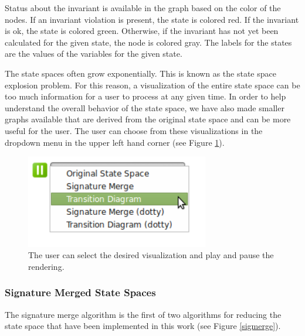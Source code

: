 Status about the invariant is available in the graph based on the color of the nodes. If an invariant violation is present, the state is colored red. If the invariant is ok, the state is colored green. Otherwise, if the invariant has not yet been calculated for the given state, the node is colored gray. The labels for the states are the values of the variables for the given state.

The state spaces often grow exponentially. This is known as the state space explosion problem. For this reason, a visualization of the entire state space can be too much information for a user to process at any given time. In order to help understand the overall behavior of the state space, we have also made smaller graphs available that are derived from the original state space and can be more useful for the user. The user can choose from these visualizations in the dropdown menu in the upper left hand corner (see Figure \ref{userSelect}).

\begin{center}
\begin{figure}[h!]
\centering
\includegraphics[width=8cm]{bilder/menu.png}
\caption{The user can select the desired visualization and play and pause the rendering.}
\label{userSelect}
\end{figure}
\end{center}

\subsubsection{Signature Merged State Spaces}

The signature merge algorithm is the first of two algorithms for reducing the state space that have been implemented in this work (see Figure \ref{sigmerge}). 

